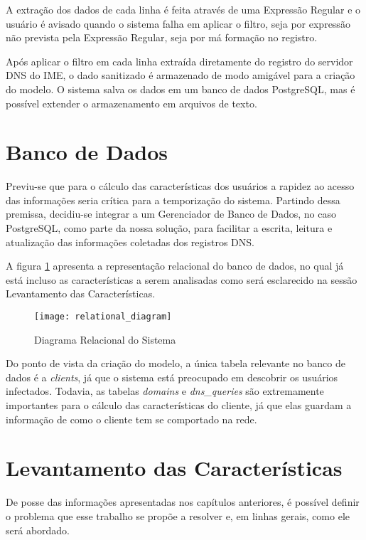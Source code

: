 A extração dos dados de cada linha é feita através de uma Expressão Regular e o usuário é avisado quando o sistema falha em aplicar o filtro, seja por expressão não prevista pela Expressão Regular, seja por má formação no registro. 

Após aplicar o filtro em cada linha extraída diretamente do registro do servidor DNS do IME, o dado sanitizado é armazenado de modo amigável para a criação do modelo. O sistema salva os dados em um banco de dados PostgreSQL, mas é possível extender o armazenamento em arquivos de texto.

\section{Banco de Dados}
Previu-se que para o cálculo das características dos usuários a rapidez ao acesso das informações seria crítica para a temporização do sistema. Partindo dessa premissa, decidiu-se integrar a um Gerenciador de Banco de Dados, no caso PostgreSQL, como parte da nossa solução, para facilitar a escrita, leitura e atualização das informações coletadas dos registros DNS.

A figura \ref{fig:relational_diagram} apresenta a representação relacional do banco de dados, no qual já está incluso as características a serem analisadas como será esclarecido na sessão Levantamento das Características.

\begin{figure}
\texttt{[image: relational\_diagram]}
\caption[Diagrama Relacional do Sistema]{Diagrama Relacional do Sistema} \label{fig:relational_diagram}
\end{figure}

Do ponto de vista da criação do modelo, a única tabela relevante no banco de dados é a \textit{clients}, já que o sistema está preocupado em descobrir os usuários infectados. Todavia, as tabelas \textit{domains} e \textit{dns\_queries} são extremamente importantes para o cálculo das características do cliente, já que elas guardam a informação de como o cliente tem se comportado na rede.

\section{Levantamento das Características}
De posse das informações apresentadas nos capítulos anteriores, é possível definir o problema que esse trabalho se propõe a resolver e, em linhas gerais, como ele será abordado.


